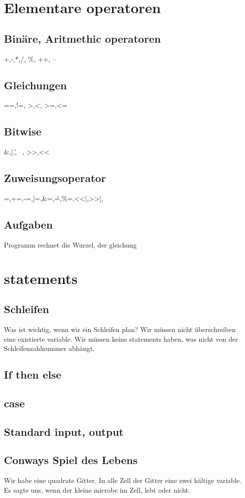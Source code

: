 \documentclass{article}[12pt]
\begin{document}
\section{Elementare operatoren}
\subsection{Binäre, Aritmethic operatoren}
+,-,*,/, \%, ++, -- 
\subsection{Gleichungen}
==,!=, >,<, >=,<=
\subsection{Bitwise}
\&,|,\^, ~, >>,<<
\subsection{Zuweisungsoperator}
=,+=,-=,|=,\&=,\^=,\%=,<<|,>>|,
\subsection{Aufgaben}
Programm rechnet die Wurzel, der gleichung
\section{statements}
\subsection{Schleifen}
Was ist wichtig, wenn wir ein Schleifen plan? Wir müssen nicht überschreiben eine existierte variable. Wir müssen keine
statements haben, was nicht von der Schleifenzahlnummer abhängt.
\subsection{If then else}
\subsection{case}
\subsection{Standard input, output}
\subsection{Conways Spiel des Lebens}
Wir habe eine quadrate Gitter. In alle Zell der Gitter eine zwei hältige variable. Es sagte uns, wenn der
kleine microbe im Zell, lebt oder nicht.
\end{document}
